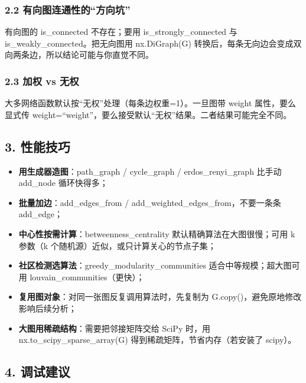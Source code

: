 \subsubsection{2.2
有向图连通性的``方向坑''}\label{ux6709ux5411ux56feux8fdeux901aux6027ux7684ux65b9ux5411ux5751}

有向图的 is\_connected 不存在；要用 is\_strongly\_connected 与
is\_weakly\_connected。把无向图用 nx.DiGraph(G)
转换后，每条无向边会变成双向两条边，所以结论可能与你直觉不同。

\subsubsection{2.3 加权 vs 无权}\label{ux52a0ux6743-vs-ux65e0ux6743}

大多网络函数默认按``无权''处理（每条边权重=1）。一旦图带 weight
属性，要么显式传
weight=``weight''，要么接受默认``无权''结果。二者结果可能完全不同。

\subsection{3. 性能技巧}\label{ux6027ux80fdux6280ux5de7-4}

\begin{itemize}
\tightlist
\item
  \textbf{用生成器造图}：path\_graph / cycle\_graph /
  erdos\_renyi\_graph 比手动 add\_node 循环快得多；
\item
  \textbf{批量加边}：add\_edges\_from /
  add\_weighted\_edges\_from，不要一条条 add\_edge；
\item
  \textbf{中心性按需计算}：betweenness\_centrality
  默认精确算法在大图很慢；可用 k 参数（k
  个随机源）近似，或只计算关心的节点子集；
\item
  \textbf{社区检测选算法}：greedy\_modularity\_communities
  适合中等规模；超大图可用 louvain\_communities（更快）；
\item
  \textbf{复用图对象}：对同一张图反复调用算法时，先复制为
  G.copy()，避免原地修改影响后续分析；
\item
  \textbf{大图用稀疏结构}：需要把邻接矩阵交给 SciPy 时，用
  nx.to\_scipy\_sparse\_array(G) 得到稀疏矩阵，节省内存（若安装了
  scipy）。
\end{itemize}

\subsection{4. 调试建议}\label{ux8c03ux8bd5ux5efaux8bae-5}

